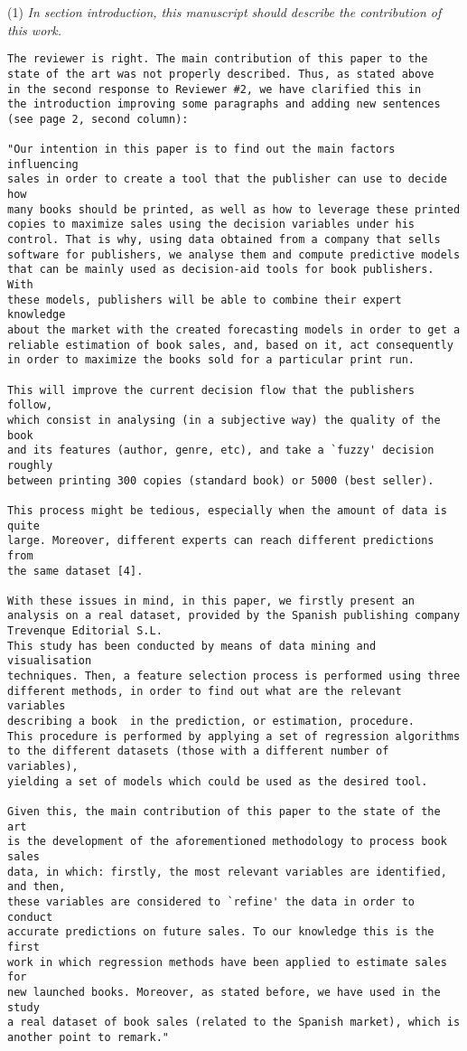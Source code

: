 \documentclass[preprint]{elsarticle}
\begin{document}
\noindent (1) \emph{In section introduction, this manuscript should describe the contribution of this work. } 

\begin{verbatim}
The reviewer is right. The main contribution of this paper to the 
state of the art was not properly described. Thus, as stated above 
in the second response to Reviewer #2, we have clarified this in 
the introduction improving some paragraphs and adding new sentences 
(see page 2, second column):

"Our intention in this paper is to find out the main factors influencing
sales in order to create a tool that the publisher can use to decide how 
many books should be printed, as well as how to leverage these printed
copies to maximize sales using the decision variables under his
control. That is why, using data obtained from a company that sells
software for publishers, we analyse them and compute predictive models 
that can be mainly used as decision-aid tools for book publishers. With 
these models, publishers will be able to combine their expert knowledge 
about the market with the created forecasting models in order to get a 
reliable estimation of book sales, and, based on it, act consequently 
in order to maximize the books sold for a particular print run. 

This will improve the current decision flow that the publishers follow, 
which consist in analysing (in a subjective way) the quality of the book 
and its features (author, genre, etc), and take a `fuzzy' decision roughly
between printing 300 copies (standard book) or 5000 (best seller).

This process might be tedious, especially when the amount of data is quite
large. Moreover, different experts can reach different predictions from 
the same dataset [4].

With these issues in mind, in this paper, we firstly present an 
analysis on a real dataset, provided by the Spanish publishing company 
Trevenque Editorial S.L.
This study has been conducted by means of data mining and visualisation
techniques. Then, a feature selection process is performed using three
different methods, in order to find out what are the relevant variables
describing a book  in the prediction, or estimation, procedure. 
This procedure is performed by applying a set of regression algorithms 
to the different datasets (those with a different number of variables), 
yielding a set of models which could be used as the desired tool. 

Given this, the main contribution of this paper to the state of the art 
is the development of the aforementioned methodology to process book sales 
data, in which: firstly, the most relevant variables are identified, and then,
these variables are considered to `refine' the data in order to conduct
accurate predictions on future sales. To our knowledge this is the first 
work in which regression methods have been applied to estimate sales for 
new launched books. Moreover, as stated before, we have used in the study 
a real dataset of book sales (related to the Spanish market), which is 
another point to remark."
\end{verbatim}
\end{document}
